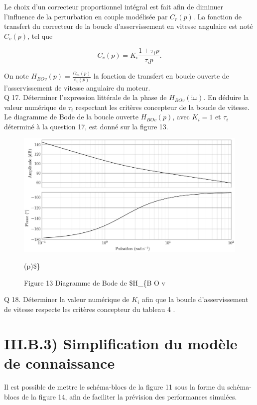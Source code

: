 \documentclass[10pt]{article}
\begin{document}
Le choix d'un correcteur proportionnel intégral est fait afin de diminuer l'influence de la perturbation en couple modélisée par $C_{r}(p)$. La fonction de transfert du correcteur de la boucle d'asservissement en vitesse angulaire est noté $C_{v}(p)$, tel que

$$
C_{v}(p)=K_{i} \frac{1+\tau_{i} p}{\tau_{i} p} .
$$

On note $H_{B O v}(p)=\frac{\Omega_{m}(p)}{\varepsilon_{v}(p)}$ la fonction de transfert en boucle ouverte de l'asservissement de vitesse angulaire du moteur.\\
Q 17. Déterminer l'expression littérale de la phase de $H_{B O v}(\mathrm{i} \omega)$. En déduire la valeur numérique de $\tau_{i}$ respectant les critères concepteur de la boucle de vitesse.\\
Le diagramme de Bode de la boucle ouverte $H_{B O v}(p)$, avec $K_{i}=1$ et $\tau_{i}$ déterminé à la question 17, est donné sur la figure 13.

\begin{figure}[h]
\begin{center}
  \includegraphics[width=\textwidth]{2025_09_16_5f2d7643f7e649c6833dg-10(1)}
\captionsetup{labelformat=empty}
\caption{Figure 13 Diagramme de Bode de \$H\_\{B O v}(p)\$\}\end{center}
\end{figure}

Q 18. Déterminer la valeur numérique de $K_{i}$ afin que la boucle d'asservissement de vitesse respecte les critères concepteur du tableau 4 .

\section{III.B.3) Simplification du modèle de connaissance}
Il est possible de mettre le schéma-blocs de la figure 11 sous la forme du schéma-blocs de la figure 14, afin de faciliter la prévision des performances simulées.
\end{document}
